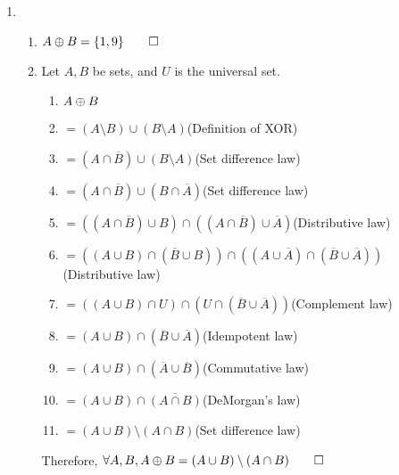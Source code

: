 \documentclass[12pt, a4paper]{article}
\begin{document}
\begin{enumerate}[Q\arabic*.]
  \item 
    \begin{enumerate}[(\alph*)]
      \item $A \oplus B = \{1, 9\} \qed$
      \item Let $A, B$ be sets, and $U$ is the universal set.
        \begin{enumerate}[\arabic*.]
          \item $A \oplus B$
          \item $= (A \setminus B) \cup (B \setminus A)$\hfill(Definition of XOR)
          \item $= (A \cap \overline{B}) \cup (B \setminus A)$\hfill(Set difference law)
          \item $= (A \cap \overline{B}) \cup (B \cap \overline{A})$\hfill(Set difference law)
          \item $= ((A \cap \overline{B}) \cup B) \cap ((A \cap \overline{B}) \cup \overline{A})$\hfill(Distributive law)
          \item $= ((A \cup B) \cap (\overline{B} \cup B)) \cap ((A \cup \overline{A}) \cap (\overline{B} \cup \overline{A}))$\hfill(Distributive law)
          \item $= ((A \cup B) \cap U) \cap (U \cap (\overline{B} \cup \overline{A}))$\hfill(Complement law)
          \item $= (A \cup B) \cap (\overline{B} \cup \overline{A})$\hfill(Idempotent law)
          \item $= (A \cup B) \cap (\overline{A} \cup \overline{B})$\hfill(Commutative law)
          \item $= (A \cup B) \cap \overline{(A \cap B)}$\hfill(DeMorgan's law)
          \item $= (A \cup B) \setminus (A \cap B)$\hfill(Set difference law)
        \end{enumerate}
        Therefore, $\forall A, B, A \oplus B = (A \cup B) \setminus (A \cap B) \qed$
    \end{enumerate}


\end{enumerate}
\end{document}
